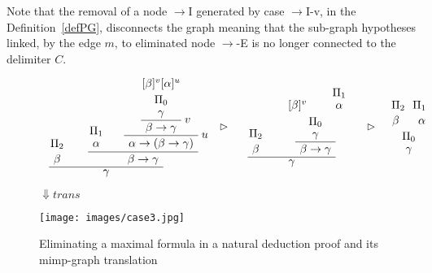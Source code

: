 \documentclass[submission,copyright,creativecommons]{eptcs}
\def\a{\AxiomC}
\def\u{\UnaryInfC}
\def\b{\BinaryInfC}
\begin{document}
Note that the removal of a node $\to$I generated by case $\to$I-v, in the
Definition~\ref{defPG}, disconnects the graph meaning that the sub-graph
hypotheses linked, by the edge $m$, to eliminated node $\to$-E is no longer
connected to the delimiter $C$.

\begin{figure}[p]
\begin{minipage}[c]{15cm}

\centering
\begin{small}

\centering
 $\begin{array}{lcr}
 \a{$\Pi_2$}
  \noLine
  \u{$\beta$} 

  \a{$\Pi_1$}
  \noLine
  \u{$\alpha$} 
 
  \a{$[\beta]^v [\alpha]^u$}
  \noLine
  \u{$\Pi_0$}
  \noLine
  \u{$\gamma$}\RightLabel{$v$}
  \u{$\beta\to\gamma$}\RightLabel{$u$}
  \u{$\alpha\to(\beta\to\gamma)$}

  \b{$\beta\to\gamma$} 

  \b{$\gamma$} 
\DisplayProof
 &
\rhd
\hspace{0.5cm}
  \a{$\Pi_2$} 
  \noLine
  \u{$\beta$}
  \a{$[\beta]^v$}
  \a{$\Pi_1$}
  \noLine
  \u{$\alpha$}
  \noLine
  \b{$\Pi_0$}
  \noLine
  \u{$\gamma$}
  \u{$\beta \to \gamma$}
  \b{$\gamma$}
\DisplayProof
\hspace{0.5cm}
\rhd
&
  \a{$\Pi_2$ \ $\Pi_1$}
    \noLine
  \u{$\beta$ \ \ \ \ $\alpha$}
  \noLine
  \u{$\Pi_0$}
  \noLine
  \u{$\gamma$}
\DisplayProof

 \end{array}$
\end{small}	
	
	\vspace{0.8cm}
 	$\Downarrow trans$
	 \vspace{0.8cm}
\end{minipage}
\begin{minipage}[r]{15cm}
	\centering
	\texttt{[image: images/case3.jpg]}
\end{minipage}
\caption{Eliminating a maximal formula in a natural deduction proof and its mimp-graph translation}
\label{case3i}
\end{figure}
\end{document}
